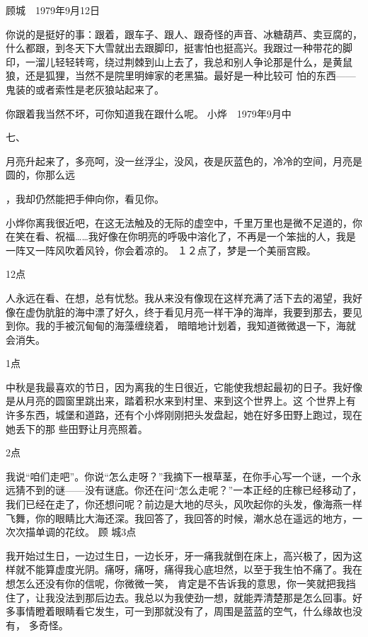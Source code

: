 \documentclass{article}
\begin{document}
顾城　1979年9月12日 



你说的是挺好的事：跟着，跟车子、跟人、跟奇怪的声音、冰糖葫芦、卖豆腐的，什么都跟，到冬天下大雪就出去跟脚印，挺害怕也挺高兴。我跟过一种带花的脚印，一溜儿轻轻转弯，绕过荆棘到山上去了，我总和别人争论那是什么，是黄鼠狼，还是狐狸，当然不是院里明婶家的老黑猫。最好是一种比较可
怕的东西——鬼装的或者索性是老灰狼站起来了。 

你跟着我当然不坏，可你知道我在跟什么呢。
 小烨　1979年9月中 


七、 



月亮升起来了，多亮呵，没一丝浮尘，没风，夜是灰蓝色的，冷冷的空间，月亮是圆的，你那么远
\newpage

，我却仍然能把手伸向你，看见你。 

小烨你离我很近吧，在这无法触及的无际的虚空中，千里万里也是微不足道的，你在笑在看、祝福……我好像在你明亮的呼吸中溶化了，不再是一个笨拙的人，我是一阵又一阵风吹着风铃，你会着凉的。
１２点了，梦是一个美丽宫殿。 


12点 

人永远在看、在想，总有忧愁。我从来没有像现在这样充满了活下去的渴望，我好像在虚伪肮脏的海中漂了好久，终于看见月亮一样干净的海岸，我要到那去，要见到你。我的手被沉甸甸的海藻缠绕着，
暗暗地计划着，我知道微微退一下，海就会消失。 


1点 

中秋是我最喜欢的节日，因为离我的生日很近，它能使我想起最初的日子。我好像是从月亮的圆窗里跳出来，踏着积水来到村里、来到这个世界上。这
\newpage
个世界上有许多东西，城堡和道路，还有个小烨刚刚把头发盘起，她在好多田野上跑过，现在她丢下的那
些田野让月亮照着。 


2点 

我说“咱们走吧”。你说“怎么走呀？”我摘下一根草茎，在你手心写一个谜，一个永远猜不到的谜——没有谜底。你还在问“怎么走呢？”一本正经的庄稼已经移动了，我们已经在走了，你还想问呢？前边是大地的尽头，风吹起你的头发，像海燕一样飞舞，你的眼睛比大海还深。我回答了，我回答的时候，潮水总在遥远的地方，一次次描单调的花纹。 顾
城3点 



我开始过生日，一边过生日，一边长牙，牙一痛我就倒在床上，高兴极了，因为这样就不能算虚度光阴。痛呀，痛呀，痛得我心底坦然，以至于我生怕不痛了。我在想怎么还没有你的信呢，你微微一笑，
\newpage
肯定是不告诉我的意思，你一笑就把我挡住了，让我没法到那后边去。我总以为我使劲一想，就能弄清楚那是怎么回事。好多事情瞪着眼睛看它发生，可一到那就没有了，周围是蓝蓝的空气，什么缘故也没有，
多奇怪。 
\end{document}
